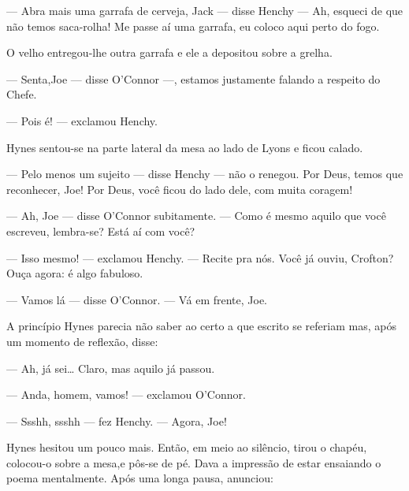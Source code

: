 --- Abra mais uma garrafa de cerveja, Jack --- disse Henchy --- Ah,
esqueci de que não temos saca-rolha! Me passe aí uma garrafa, eu
coloco aqui perto do fogo.

O velho entregou-lhe outra garrafa e ele a depositou sobre a grelha.

--- Senta,Joe --- disse O'Connor ---, estamos justamente falando a
respeito do Chefe.

--- Pois é! --- exclamou Henchy.

Hynes sentou-se na parte lateral da mesa ao lado de Lyons e
ficou calado.

--- Pelo menos um sujeito --- disse Henchy --- não o renegou. Por
Deus, temos que reconhecer, Joe! Por Deus, você ficou do lado dele,
com muita coragem!

--- Ah, Joe --- disse O'Connor subitamente. --- Como é mesmo aquilo
que você escreveu, lembra-se? Está aí com você?

--- Isso mesmo! --- exclamou Henchy. --- Recite pra nós. Você já
ouviu, Crofton? Ouça agora: é algo fabuloso.

--- Vamos lá --- disse O'Connor. --- Vá em frente, Joe.

A princípio Hynes parecia não saber ao certo a que escrito se referiam
mas, após um momento de reflexão, disse:

--- Ah, já sei\ldots{} Claro, mas aquilo já passou.

--- Anda, homem, vamos! --- exclamou O'Connor.

--- Ssshh, ssshh --- fez Henchy. --- Agora, Joe!

Hynes hesitou um pouco mais. Então, em meio ao silêncio, tirou o
chapéu, colocou-o sobre a mesa,e pôs-se de pé. Dava a impressão de
estar ensaiando o poema mentalmente. Após uma longa pausa, anunciou:

